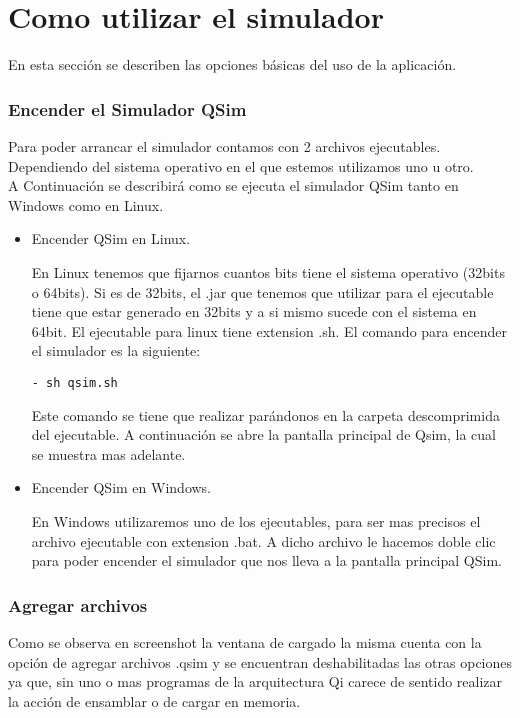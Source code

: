 \section{Como utilizar el simulador}

En esta sección se describen las opciones básicas del uso de la aplicación.

\subsubsection{Encender el Simulador QSim}
Para poder arrancar el simulador contamos con 2 archivos ejecutables. 
Dependiendo del sistema operativo en el que estemos utilizamos uno u otro.\\

A Continuación se describirá como se ejecuta el simulador QSim tanto en Windows como en Linux.
\begin{itemize}

\item Encender QSim en Linux.

En Linux tenemos que fijarnos cuantos bits tiene el sistema operativo (32bits o 64bits). Si es de 32bits, el .jar que tenemos que utilizar para el ejecutable tiene que estar generado en 32bits y a si mismo sucede con el sistema en 64bit. El ejecutable para linux tiene extension .sh. El comando para encender el simulador es la siguiente:

\begin{verbatim}
- sh qsim.sh
\end{verbatim}

Este comando se tiene que realizar parándonos en la carpeta descomprimida del ejecutable. 
A continuación se abre la pantalla principal de Qsim, la cual se muestra mas adelante.
\item Encender QSim en Windows.

En Windows utilizaremos uno de los ejecutables, para ser mas precisos el archivo ejecutable con extension .bat.
A dicho archivo le hacemos doble clic para poder encender el simulador que nos lleva a la pantalla principal QSim.

 
\end{itemize}

\subsubsection{Agregar archivos}
Como se observa en screenshot la ventana de cargado la misma cuenta con la opción de agregar archivos .qsim y se encuentran deshabilitadas las otras opciones ya que, sin uno o mas programas de la arquitectura Qi carece de sentido realizar la acción de ensamblar o de cargar en memoria.

